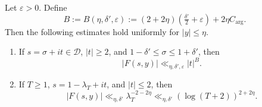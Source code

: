 \begin{lemma}
\label{lem:F-contour-bounds}
Let $\varepsilon > 0$. Define
\begin{equation}\label{eq:B-exponent}
    B := B(\eta,\delta',\varepsilon)
       := (2 + 2\eta)\!\left(\tfrac{\delta'}{2}+\varepsilon\right)
        + 2\eta C_{\arg}.
\end{equation}
Then the following estimates hold uniformly for $|y|\leq\eta$.
\begin{enumerate}
    \item If $s=\sigma+it\in\mathcal{D}$, $|t|\geq2$, and
    $1-\delta'\leq\sigma\leq1+\delta'$, then
    \begin{equation}\label{eq:F-bound-on-contour}
        |F(s,y)|\ll_{\eta,\delta',\varepsilon}|t|^B.
    \end{equation}
    \item If $T\geq1$, $s=1-\lambda_T+it$, and $|t|\leq2$, then
    \begin{equation}\label{eq:F-low-height-bound}
        |F(s,y)|
        \ll_{\eta,\delta'} \lambda_T^{-2-2\eta}
        \ll_{\eta,\delta'} (\log(T+2))^{2+2\eta}.
    \end{equation}
\end{enumerate}
\end{lemma}

